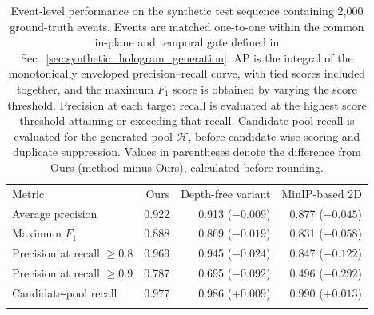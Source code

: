 \begin{table}[tbp]
  \centering
  \caption{Event-level performance on the synthetic test sequence containing 2,000 ground-truth events.
Events are matched one-to-one within the common in-plane and temporal gate defined in Sec.~\ref{sec:synthetic_hologram_generation}.
AP is the integral of the monotonically enveloped precision--recall curve, with tied scores included together, and the maximum \(F_1\) score is obtained by varying the score threshold.
Precision at each target recall is evaluated at the highest score threshold attaining or exceeding that recall.
Candidate-pool recall is evaluated for the generated pool \(\mathcal{H}\), before candidate-wise scoring and duplicate suppression.
Values in parentheses denote the difference from Ours (method minus Ours), calculated before rounding.}
  \label{tab:projected_xy_metric_summary}
  \begin{tabular}{lrrr}
    \tophline
    Metric & Ours & Depth-free variant & MinIP-based 2D \\
    \middlehline
    Average precision & 0.922 & 0.913 (${-0.009}$) & 0.877 (${-0.045}$) \\
    Maximum $F_1$ & 0.888 & 0.869 (${-0.019}$) & 0.831 (${-0.058}$) \\
    Precision at recall $\geq0.8$ & 0.969 & 0.945 (${-0.024}$) & 0.847 (${-0.122}$) \\
    Precision at recall $\geq0.9$ & 0.787 & 0.695 (${-0.092}$) & 0.496 (${-0.292}$) \\
    Candidate-pool recall & 0.977 & 0.986 (${+0.009}$) & 0.990 (${+0.013}$) \\
    \bottomhline
  \end{tabular}
\end{table}
